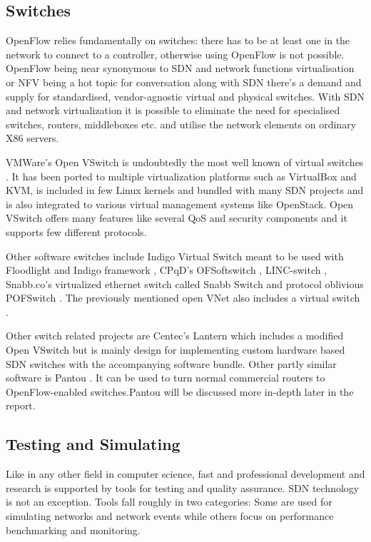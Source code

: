 \documentclass[english]{tktltiki2}
\theoremstyle{definition}
\theoremstyle{remark}
\begin{document}
\subsection{Switches}

OpenFlow relies fundamentally on switches: there has to be at least one in the network to connect to a controller, otherwise using OpenFlow is not possible. OpenFlow being near synonymous to SDN and network functions virtualisation or NFV being a hot topic for conversation along with SDN there’s a demand and supply for standardised, vendor-agnostic virtual and physical switches. With SDN and network virtualization it is possible to eliminate the need for specialised switches, routers, middleboxes etc. and utilise the network elements on ordinary X86 servers.

VMWare’s Open VSwitch is undoubtedly the most well known of virtual switches \cite{VSwitch}. It has been ported to multiple virtualization platforms such as VirtualBox
and KVM, is included in few Linux kernels and bundled with many SDN projects and is also integrated to various virtual management systems like OpenStack. Open VSwitch offers many features like several QoS and security components and it supports few different protocols.

Other software switches include Indigo Virtual Switch meant to be used with Floodlight and Indigo framework \cite{IndigoSwitch}, CPqD’s OFSoftswitch \cite{OfSwitch}, LINC-switch \cite{LINC}, Snabb.co’s virtualized ethernet switch called Snabb Switch \cite{Snabb} and protocol oblivious POFSwitch \cite{POFSwitch}. The previously mentioned open VNet also includes a virtual switch \cite{VNet}. 

Other switch related projects are Centec’s Lantern \cite{Lantern} which includes a modified Open VSwitch but is mainly design for implementing custom  hardware based SDN switches with the accompanying software bundle. Other partly similar software is Pantou \cite{Yia04}. It can be used to turn normal commercial routers to OpenFlow-enabled switches.Pantou will be discussed more in-depth later in the report.

\subsection{Testing and Simulating}

Like in any other field in computer science, fast and professional development and research is supported by tools for testing and quality assurance. SDN technology is not an exception. Tools fall roughly in two categories: Some are used for simulating networks and network events while others focus on performance benchmarking and monitoring.
\end{document}
